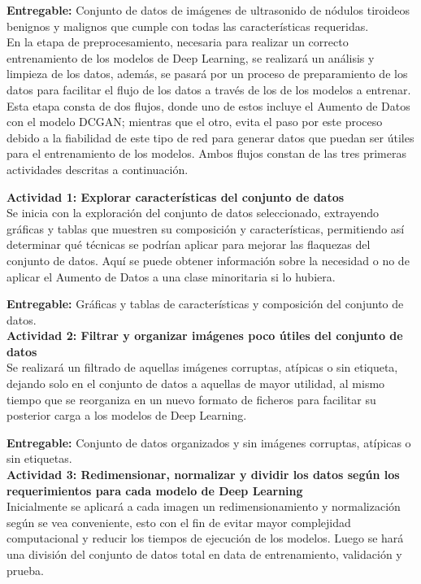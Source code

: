 \textbf{Entregable:} Conjunto de datos de imágenes de ultrasonido de nódulos tiroideos benignos y malignos que cumple con todas las características requeridas.
\\
En la etapa de preprocesamiento, necesaria para realizar un correcto entrenamiento de los modelos de Deep Learning, se realizará un análisis y limpieza de los datos, además, se pasará por un proceso de preparamiento de los datos para facilitar el flujo de los datos a través de los de los modelos a entrenar. Esta etapa consta de dos flujos, donde uno de estos incluye el Aumento de Datos con el modelo DCGAN; mientras que el otro, evita el paso por este proceso debido a la fiabilidad de este tipo de red para generar datos que puedan ser útiles para el entrenamiento de los modelos. Ambos flujos constan de las tres primeras actividades descritas a continuación.

\textbf{Actividad 1: Explorar características del conjunto de datos}
\\
Se inicia con la exploración del conjunto de datos seleccionado, extrayendo gráficas y tablas que muestren su composición y características, permitiendo así determinar qué técnicas se podrían aplicar para mejorar las flaquezas del conjunto de datos. Aquí se puede obtener información sobre la necesidad o no de aplicar el Aumento de Datos a una clase minoritaria si lo hubiera.

\textbf{Entregable:} Gráficas y tablas de características y composición del conjunto de datos.
\\

\textbf{Actividad 2: Filtrar y organizar imágenes poco útiles del conjunto de datos}
\\
Se realizará un filtrado de aquellas imágenes corruptas, atípicas o sin etiqueta, dejando solo en el conjunto de datos a aquellas de mayor utilidad, al mismo tiempo que se reorganiza en un nuevo formato de ficheros para facilitar su posterior carga a los modelos de Deep Learning.

\textbf{Entregable:} Conjunto de datos organizados y sin imágenes corruptas, atípicas o sin etiquetas.
\\

\textbf{Actividad 3: Redimensionar, normalizar y dividir los datos según los requerimientos para cada modelo de Deep Learning}
\\
Inicialmente se aplicará a cada imagen un redimensionamiento y normalización según se vea conveniente, esto con el fin de evitar mayor complejidad computacional y reducir los tiempos de ejecución de los modelos. Luego se hará una división del conjunto de datos total en data de entrenamiento, validación y prueba.

